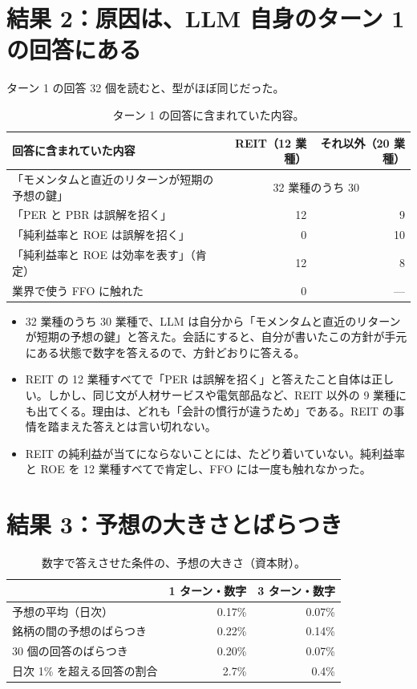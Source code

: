 \documentclass[xelatex,ja=standard,jafont=hiragino-pron,a4paper,10pt]{bxjsreport}
\begin{document}
\section{結果 2：原因は、LLM 自身のターン 1 の回答にある}

ターン 1 の回答 32 個を読むと、型がほぼ同じだった。

\begin{table}[htbp]
\centering
\caption{ターン 1 の回答に含まれていた内容。}
\small
\begin{tabular}{p{8.40cm}rr}
\toprule
回答に含まれていた内容 & REIT（12 業種） & それ以外（20 業種） \\
\midrule
「モメンタムと直近のリターンが短期の予想の鍵」 & \multicolumn{2}{c}{32 業種のうち 30} \\
「PER と PBR は誤解を招く」 & 12 & 9 \\
「純利益率と ROE は誤解を招く」 & 0 & 10 \\
「純利益率と ROE は効率を表す」（肯定） & 12 & 8 \\
業界で使う FFO に触れた & 0 & --- \\
\bottomrule
\end{tabular}
\end{table}

\begin{itemize}
\item 32 業種のうち 30 業種で、LLM は自分から「モメンタムと直近のリターンが短期の予想の鍵」と答えた。会話にすると、自分が書いたこの方針が手元にある状態で数字を答えるので、方針どおりに答える。
\item REIT の 12 業種すべてで「PER は誤解を招く」と答えたこと自体は正しい。しかし、同じ文が人材サービスや電気部品など、REIT 以外の 9 業種にも出てくる。理由は、どれも「会計の慣行が違うため」である。REIT の事情を踏まえた答えとは言い切れない。
\item REIT の純利益が当てにならないことには、たどり着いていない。純利益率と ROE を 12 業種すべてで肯定し、FFO には一度も触れなかった。
\end{itemize}

\section{結果 3：予想の大きさとばらつき}

\begin{table}[htbp]
\centering
\caption{数字で答えさせた条件の、予想の大きさ（資本財）。}
\small
\begin{tabular}{lrr}
\toprule
 & 1 ターン・数字 & 3 ターン・数字 \\
\midrule
予想の平均（日次） & 0.17\% & 0.07\% \\
銘柄の間の予想のばらつき & 0.22\% & 0.14\% \\
30 個の回答のばらつき & 0.20\% & 0.07\% \\
日次 1\% を超える回答の割合 & 2.7\% & 0.4\% \\
\bottomrule
\end{tabular}
\end{table}
\end{document}
